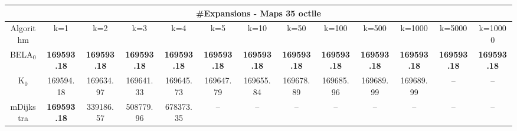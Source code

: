 \begin{tabular}{c|cccccccccccc}\toprule
\multicolumn{13}{c}{#Expansions - Maps 35 octile}\\ \midrule
Algorithm & k=1 & k=2 & k=3 & k=4 & k=5 & k=10 & k=50 & k=100 & k=500 & k=1000 & k=5000 & k=10000 \\ \midrule
BELA$_0$ & \textbf{169593.18} & \textbf{169593.18} & \textbf{169593.18} & \textbf{169593.18} & \textbf{169593.18} & \textbf{169593.18} & \textbf{169593.18} & \textbf{169593.18} & \textbf{169593.18} & \textbf{169593.18} & \textbf{169593.18} & \textbf{169593.18} \\
K$_0$ & 169594.18 & 169634.97 & 169641.33 & 169645.73 & 169647.79 & 169655.84 & 169678.89 & 169685.96 & 169689.99 & 169689.99 & -- & -- \\
mDijkstra & \textbf{169593.18} & 339186.57 & 508779.96 & 678373.35 & -- & -- & -- & -- & -- & -- & -- & -- \\ \bottomrule 
\end{tabular}

